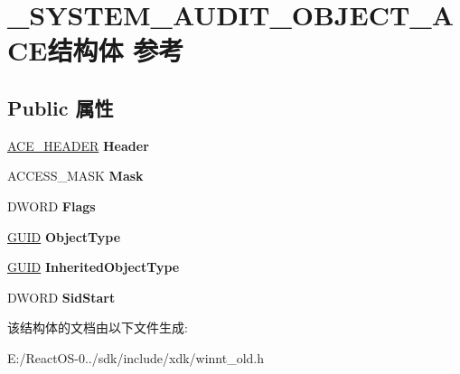 \hypertarget{struct___s_y_s_t_e_m___a_u_d_i_t___o_b_j_e_c_t___a_c_e}{}\section{\+\_\+\+S\+Y\+S\+T\+E\+M\+\_\+\+A\+U\+D\+I\+T\+\_\+\+O\+B\+J\+E\+C\+T\+\_\+\+A\+C\+E结构体 参考}
\label{struct___s_y_s_t_e_m___a_u_d_i_t___o_b_j_e_c_t___a_c_e}
\subsection*{Public 属性}
\begin{DoxyCompactItemize}
\item 
\mbox{\label{struct___s_y_s_t_e_m___a_u_d_i_t___o_b_j_e_c_t___a_c_e_a0f1503bb81b9ba4d4425a7e40ce0372a}} 
\hyperlink{struct___a_c_e___h_e_a_d_e_r}{A\+C\+E\+\_\+\+H\+E\+A\+D\+ER} {\bfseries Header}
\item 
\mbox{\label{struct___s_y_s_t_e_m___a_u_d_i_t___o_b_j_e_c_t___a_c_e_aae5e256269424e985f07aa80509c221b}} 
A\+C\+C\+E\+S\+S\+\_\+\+M\+A\+SK {\bfseries Mask}
\item 
\mbox{\label{struct___s_y_s_t_e_m___a_u_d_i_t___o_b_j_e_c_t___a_c_e_ae51e4c5a9e35ca7ca5c12b7f914257b7}} 
D\+W\+O\+RD {\bfseries Flags}
\item 
\mbox{\label{struct___s_y_s_t_e_m___a_u_d_i_t___o_b_j_e_c_t___a_c_e_af5c9226a504cd98690fa7f838805eb27}} 
\hyperlink{interface_g_u_i_d}{G\+U\+ID} {\bfseries Object\+Type}
\item 
\mbox{\label{struct___s_y_s_t_e_m___a_u_d_i_t___o_b_j_e_c_t___a_c_e_a6ceb72881f0316a7bfb86ae30270d455}} 
\hyperlink{interface_g_u_i_d}{G\+U\+ID} {\bfseries Inherited\+Object\+Type}
\item 
\mbox{\label{struct___s_y_s_t_e_m___a_u_d_i_t___o_b_j_e_c_t___a_c_e_ab59043e1464ed32ce60ae895768ff3c6}} 
D\+W\+O\+RD {\bfseries Sid\+Start}
\end{DoxyCompactItemize}


该结构体的文档由以下文件生成\+:\begin{DoxyCompactItemize}
\item 
E\+:/\+React\+O\+S-\/0../sdk/include/xdk/winnt\+\_\+old.\+h\end{DoxyCompactItemize}
